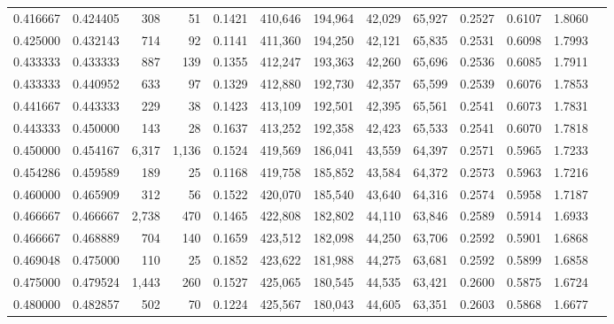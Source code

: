 \begin{tabular}{rrrrrrrrrrrrr}
0.416667 & 0.424405 &    308 &     51 &                                     0.1421 & 410,646 & 194,964 &  42,029 &  65,927 & 0.2527 & 0.6107 & 1.8060 \\
0.425000 & 0.432143 &    714 &     92 &                                     0.1141 & 411,360 & 194,250 &  42,121 &  65,835 & 0.2531 & 0.6098 & 1.7993 \\
0.433333 & 0.433333 &    887 &    139 &                                     0.1355 & 412,247 & 193,363 &  42,260 &  65,696 & 0.2536 & 0.6085 & 1.7911 \\
0.433333 & 0.440952 &    633 &     97 &                                     0.1329 & 412,880 & 192,730 &  42,357 &  65,599 & 0.2539 & 0.6076 & 1.7853 \\
0.441667 & 0.443333 &    229 &     38 &                                     0.1423 & 413,109 & 192,501 &  42,395 &  65,561 & 0.2541 & 0.6073 & 1.7831 \\
0.443333 & 0.450000 &    143 &     28 &                                     0.1637 & 413,252 & 192,358 &  42,423 &  65,533 & 0.2541 & 0.6070 & 1.7818 \\
0.450000 & 0.454167 &  6,317 &  1,136 &                                     0.1524 & 419,569 & 186,041 &  43,559 &  64,397 & 0.2571 & 0.5965 & 1.7233 \\
0.454286 & 0.459589 &    189 &     25 &                                     0.1168 & 419,758 & 185,852 &  43,584 &  64,372 & 0.2573 & 0.5963 & 1.7216 \\
0.460000 & 0.465909 &    312 &     56 &                                     0.1522 & 420,070 & 185,540 &  43,640 &  64,316 & 0.2574 & 0.5958 & 1.7187 \\
0.466667 & 0.466667 &  2,738 &    470 &                                     0.1465 & 422,808 & 182,802 &  44,110 &  63,846 & 0.2589 & 0.5914 & 1.6933 \\
0.466667 & 0.468889 &    704 &    140 &                                     0.1659 & 423,512 & 182,098 &  44,250 &  63,706 & 0.2592 & 0.5901 & 1.6868 \\
0.469048 & 0.475000 &    110 &     25 &                                     0.1852 & 423,622 & 181,988 &  44,275 &  63,681 & 0.2592 & 0.5899 & 1.6858 \\
0.475000 & 0.479524 &  1,443 &    260 &                                     0.1527 & 425,065 & 180,545 &  44,535 &  63,421 & 0.2600 & 0.5875 & 1.6724 \\
0.480000 & 0.482857 &    502 &     70 &                                     0.1224 & 425,567 & 180,043 &  44,605 &  63,351 & 0.2603 & 0.5868 & 1.6677 \\

\end{tabular}
